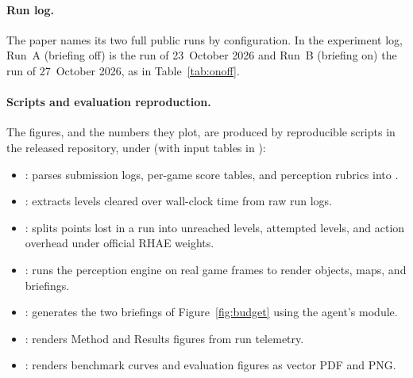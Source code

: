 \paragraph{Run log.}
The paper names its two full public runs by configuration. In the experiment log, Run~A (briefing off) is the run of 23~October 2026 and Run~B (briefing on) the run of 27~October 2026, as in Table~\ref{tab:onoff}.

\paragraph{Scripts and evaluation reproduction.}
The figures, and the numbers they plot, are produced by reproducible scripts in the released repository, under \href{https://github.com/Harsidak/SARBLOH/tree/main/Writing/scripts}{} (with input tables in \href{https://github.com/Harsidak/SARBLOH/tree/main/Writing/data}{}):
\begin{itemize}
    \item {}: parses submission logs, per-game score tables, and perception rubrics into .
    \item {}: extracts levels cleared over wall-clock time from raw run logs.
    \item {}: splits points lost in a run into unreached levels, attempted levels, and action overhead under official RHAE weights.
    \item {}: runs the perception engine on real game frames to render objects, maps, and briefings.
    \item {}: generates the two  briefings of Figure~\ref{fig:budget} using the agent's  module.
    \item {}: renders Method and Results figures from run telemetry.
    \item {}: renders benchmark curves and evaluation figures as vector PDF and PNG.
\end{itemize}
